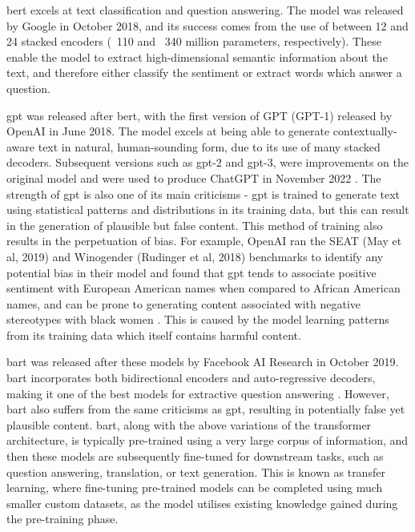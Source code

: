\acrshort{bert} excels at text classification and question answering. The model was released by Google in October 2018, and its success comes from the use of between 12 and 24 stacked encoders (~110 and ~340 million parameters, respectively). These enable the model to extract high-dimensional semantic information about the text, and therefore either classify the sentiment or extract words which answer a question.

\acrshort{gpt} was released after \acrshort{bert}, with the first version of GPT (GPT-1) released by OpenAI in June 2018. The model excels at being able to generate contextually-aware text in natural, human-sounding form, due to its use of many stacked decoders. Subsequent versions such as \acrshort{gpt}-2 and \acrshort{gpt}-3, were improvements on the original model and were used to produce ChatGPT in November 2022 \citep{ChatGPTrelease}. The strength of \acrshort{gpt} is also one of its main criticisms - \acrshort{gpt} is trained to  generate text using statistical patterns and distributions in its training data, but this can result in the generation of plausible but false content. This method of training also results in the perpetuation of bias. For example, OpenAI ran the SEAT (May et al, 2019) and Winogender (Rudinger et al, 2018) benchmarks to identify any potential bias in their model and found that \acrshort{gpt} tends to associate positive sentiment with European American names when compared to African American names, and can be prone to generating content associated with negative stereotypes with black women \citep{openAIembeddings}. This is caused by the model learning patterns from its training data which itself contains harmful content.

\acrshort{bart} was released after these models by Facebook AI Research in October 2019. \acrshort{bart} incorporates both bidirectional encoders and auto-regressive decoders, making it one of the best models for extractive question answering \citep{pearce2021comparative}. However, \acrshort{bart} also suffers from the same criticisms as \acrshort{gpt}, resulting in potentially false yet plausible content. \acrshort{bart}, along with the above variations of the transformer architecture, is typically pre-trained using a very large corpus of information, and then these models are subsequently fine-tuned for downstream tasks, such as question answering, translation, or text generation. This is known as transfer learning, where fine-tuning pre-trained models can be completed using much smaller custom datasets, as the model utilises existing knowledge gained during the pre-training phase.



